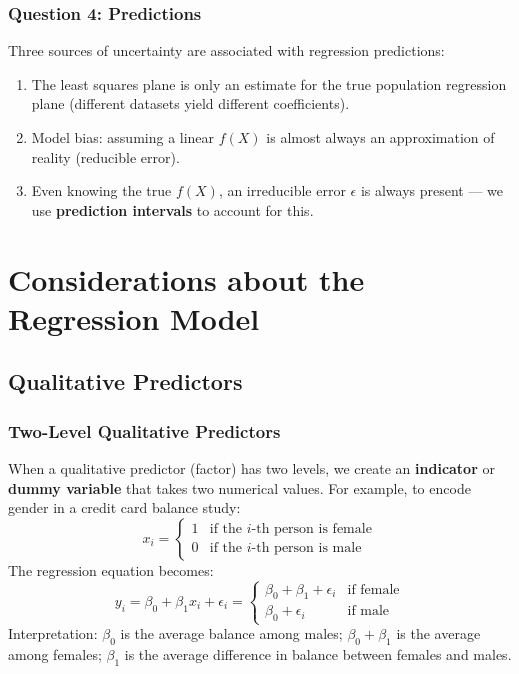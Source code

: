 \documentclass[11pt,a4paper]{article}
\theoremstyle{definition}
\theoremstyle{plain}
\theoremstyle{remark}
\begin{document}
\subsubsection{Question 4: Predictions}

Three sources of uncertainty are associated with regression predictions:
\begin{enumerate}
    \item The least squares plane is only an estimate for the true population regression plane (different datasets yield different coefficients).
    \item Model bias: assuming a linear $f(X)$ is almost always an approximation of reality (reducible error).
    \item Even knowing the true $f(X)$, an irreducible error $\epsilon$ is always present — we use \textbf{prediction intervals} to account for this.
\end{enumerate}


\section{Considerations about the Regression Model}

\subsection{Qualitative Predictors}

\subsubsection{Two-Level Qualitative Predictors}

When a qualitative predictor (factor) has two levels, we create an \textbf{indicator} or \textbf{dummy variable} that takes two numerical values. For example, to encode gender in a credit card balance study:
\[
    x_i = \begin{cases} 1 & \text{if the } i\text{-th person is female} \\ 0 & \text{if the } i\text{-th person is male} \end{cases}
\]
The regression equation becomes:
\[
    y_i = \beta_0 + \beta_1 x_i + \epsilon_i = \begin{cases} \beta_0 + \beta_1 + \epsilon_i & \text{if female} \\ \beta_0 + \epsilon_i & \text{if male} \end{cases}
\]
Interpretation: $\beta_0$ is the average balance among males; $\beta_0 + \beta_1$ is the average among females; $\beta_1$ is the average difference in balance between females and males.
\end{document}
